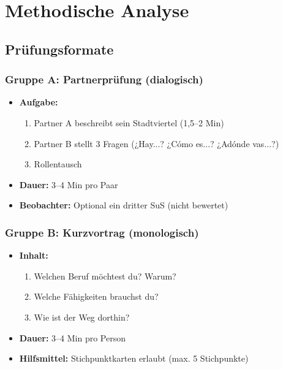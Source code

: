 \documentclass[11pt,a4paper]{article}
\begin{document}
\section{Methodische Analyse}

\subsection{Prüfungsformate}

\subsubsection{Gruppe A: Partnerprüfung (dialogisch)}
\begin{itemize}
    \item \textbf{Aufgabe:}
    \begin{enumerate}
        \item Partner A beschreibt sein Stadtviertel (1,5--2 Min)
        \item Partner B stellt 3 Fragen (¿Hay...? ¿Cómo es...? ¿Adónde vas...?)
        \item Rollentausch
    \end{enumerate}
    \item \textbf{Dauer:} 3--4 Min pro Paar
    \item \textbf{Beobachter:} Optional ein dritter SuS (nicht bewertet)
\end{itemize}

\subsubsection{Gruppe B: Kurzvortrag (monologisch)}
\begin{itemize}
    \item \textbf{Inhalt:}
    \begin{enumerate}
        \item Welchen Beruf möchtest du? Warum?
        \item Welche Fähigkeiten brauchst du?
        \item Wie ist der Weg dorthin?
    \end{enumerate}
    \item \textbf{Dauer:} 3--4 Min pro Person
    \item \textbf{Hilfsmittel:} Stichpunktkarten erlaubt (max. 5 Stichpunkte)
\end{itemize}
\end{document}
